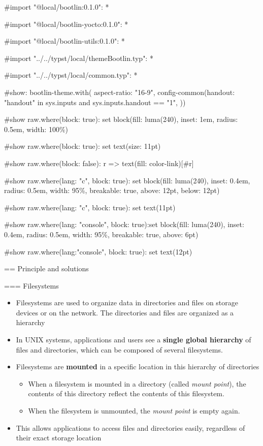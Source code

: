 #import "@local/bootlin:0.1.0": *

#import "@local/bootlin-yocto:0.1.0": *

#import "@local/bootlin-utils:0.1.0": *

#import "../../typst/local/themeBootlin.typ": *

#import "../../typst/local/common.typ": *

#show: bootlin-theme.with( aspect-ratio: "16-9", config-common(handout: "handout" in sys.inputs and sys.inputs.handout == "1", ))

#show raw.where(block: true): set block(fill: luma(240), inset: 1em, radius: 0.5em, width: 100\%)

#show raw.where(block: true): set text(size: 11pt)

#show raw.where(block: false): r => text(fill: color-link)[#r]

#show raw.where(lang: "c", block: true): set block(fill: luma(240), inset: 0.4em, radius: 0.5em, width: 95\%, breakable: true, above: 12pt, below: 12pt)

#show raw.where(lang: "c", block: true): set text(11pt)

#show raw.where(lang: "console", block: true):set block(fill: luma(240), inset: 0.4em, radius: 0.5em, width: 95\%, breakable: true, above: 6pt)

#show raw.where(lang:"console", block: true): set text(12pt)

 == Principle and solutions

=== Filesystems
  \begin{itemize}
  \item Filesystems are used to organize data in directories and files
    on storage devices or on the network. The directories and files
    are organized as a hierarchy
  \item In UNIX systems, applications and users see a {\bf single
      global hierarchy} of files and directories, which can be
    composed of several filesystems.
  \item Filesystems are {\bf mounted} in a specific location in this
    hierarchy of directories
    \begin{itemize}
    \item When a filesystem is mounted in a directory (called {\em
        mount point}), the contents of this directory reflect the
        contents of this filesystem.
    \item When the filesystem is unmounted, the {\em mount point} is
      empty again.
    \end{itemize}
  \item This allows applications to access files and directories easily,
    regardless of their exact storage location
  \end{itemize}


